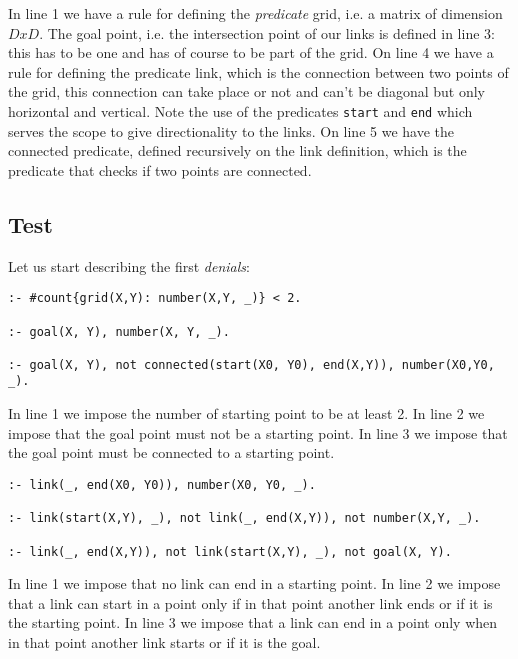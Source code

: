 In line 1 we have a rule for defining the \emph{predicate} grid, i.e. a matrix of dimension $DxD$. The goal point, i.e. the intersection point of our links is defined in line 3: this has to be one and has of course to be part of the grid.
On line 4 we have a rule for defining the predicate link, which is the connection between two points of the grid, this connection can take place or not and can't be diagonal but only horizontal and vertical. Note the use of the predicates \texttt{start} and \texttt{end} which serves the scope to give directionality to the links.
On line 5 we have the connected predicate, defined recursively on the link definition, which is the predicate that checks if two points are connected.
\subsection{Test}
Let us start describing the first \emph{denials}:

\begin{verbatim}
:- #count{grid(X,Y): number(X,Y, _)} < 2. 

:- goal(X, Y), number(X, Y, _). 

:- goal(X, Y), not connected(start(X0, Y0), end(X,Y)), number(X0,Y0, _). 
\end{verbatim}

In line 1 we impose the number of starting point to be at least 2. In line 2 we impose that the goal point must not be a starting point.
In line 3 we impose that the goal point must be connected to a starting point.


\begin{verbatim}
:- link(_, end(X0, Y0)), number(X0, Y0, _).

:- link(start(X,Y), _), not link(_, end(X,Y)), not number(X,Y, _).

:- link(_, end(X,Y)), not link(start(X,Y), _), not goal(X, Y). 
\end{verbatim}
In line 1 we impose that no link can end in a starting point. In line 2 we impose that a link can start in a point only if in that point another link ends or if it is the starting point. In line 3 we impose that a link can end in a point only when in that point another link starts or if it is the goal.



